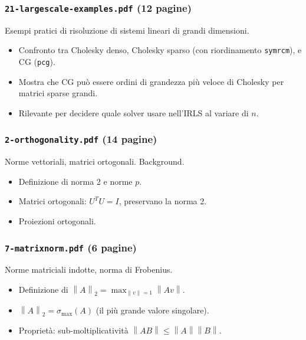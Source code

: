 \documentclass[a4paper,11pt]{article}
\theoremstyle{definition}
\newcommand{\norm}[1]{\left\lVert #1 \right\rVert}
\begin{document}
\subsubsection*{ \quad \texttt{21-largescale-examples.pdf} (12 pagine)}

Esempi pratici di risoluzione di sistemi lineari di grandi dimensioni.

\begin{itemize}
  \item Confronto tra Cholesky denso, Cholesky sparso (con riordinamento \texttt{symrcm}), e CG (\texttt{pcg}).
  \item Mostra che CG può essere ordini di grandezza più veloce di Cholesky per matrici sparse grandi.
  \item Rilevante per decidere quale solver usare nell'IRLS al variare di $n$.
\end{itemize}

\subsubsection*{ \quad \texttt{2-orthogonality.pdf} (14 pagine)}

Norme vettoriali, matrici ortogonali. Background.

\begin{itemize}
  \item Definizione di norma 2 e norme $p$.
  \item Matrici ortogonali: $U^TU = I$, preservano la norma 2.
  \item Proiezioni ortogonali.
\end{itemize}

\subsubsection*{ \quad \texttt{7-matrixnorm.pdf} (6 pagine)}

Norme matriciali indotte, norma di Frobenius.

\begin{itemize}
  \item Definizione di $\norm{A}_2 = \max_{\norm{v}=1} \norm{Av}$.
  \item $\norm{A}_2 = \sigma_{\max}(A)$ (il più grande valore singolare).
  \item Proprietà: sub-moltiplicatività $\norm{AB} \leq \norm{A}\norm{B}$.
\end{itemize}
\end{document}
